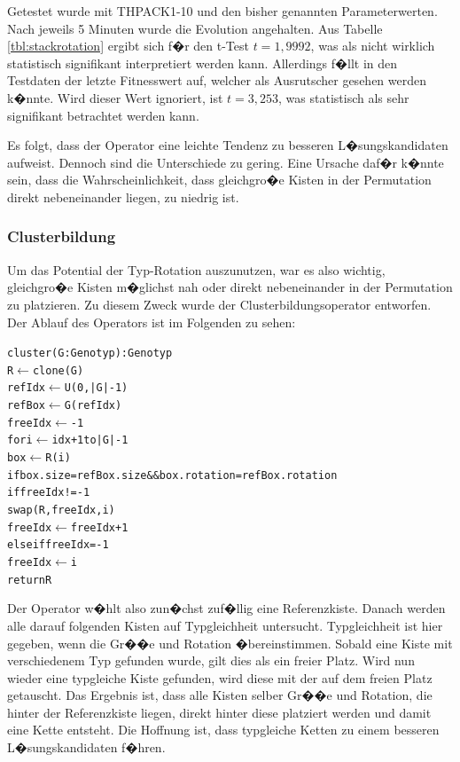 \documentclass[a4paper,abstracton,12pt]{scrartcl}
\begin{document}
Getestet wurde mit THPACK1-10 und den bisher genannten Parameterwerten. Nach jeweils 5 Minuten wurde die Evolution angehalten. Aus Tabelle \ref{tbl:stackrotation} ergibt sich f�r den t-Test $t=1,9992$, was als nicht wirklich statistisch signifikant interpretiert werden kann. Allerdings f�llt in den Testdaten der letzte Fitnesswert auf, welcher als Ausrutscher gesehen werden k�nnte. Wird dieser Wert ignoriert, ist $t=3,253$, was statistisch als sehr signifikant betrachtet werden kann.

Es folgt, dass der Operator eine leichte Tendenz zu besseren L�sungskandidaten aufweist. Dennoch sind die Unterschiede zu gering. Eine Ursache daf�r k�nnte sein, dass die Wahrscheinlichkeit, dass gleichgro�e Kisten in der Permutation direkt nebeneinander liegen, zu niedrig ist.

\subsubsection{Clusterbildung}

Um das Potential der Typ-Rotation auszunutzen, war es also wichtig, gleichgro�e Kisten m�glichst nah oder direkt nebeneinander in der Permutation zu platzieren. Zu diesem Zweck wurde der Clusterbildungsoperator entworfen. Der Ablauf des Operators ist im Folgenden zu sehen:

\begin{alltt}
cluster(G: Genotyp): Genotyp
  R \(\leftarrow\) clone(G)
  refIdx \(\leftarrow\) U(0,|G|-1)
  refBox \(\leftarrow\) G(refIdx)
  freeIdx \(\leftarrow\) -1
  for i \(\leftarrow\) idx + 1 to |G|-1
    box \(\leftarrow\) R(i)
    if box.size = refBox.size && box.rotation = refBox.rotation
      if freeIdx != -1
        swap(R, freeIdx, i)
        freeIdx \(\leftarrow\) freeIdx + 1
    else if freeIdx = -1
      freeIdx \(\leftarrow\) i
  return R
\end{alltt}

Der Operator w�hlt also zun�chst zuf�llig eine Referenzkiste. Danach werden alle darauf folgenden Kisten auf Typgleichheit untersucht. Typgleichheit ist hier gegeben, wenn die Gr��e und Rotation �bereinstimmen. Sobald eine Kiste mit verschiedenem Typ gefunden wurde, gilt dies als ein freier Platz. Wird nun wieder eine typgleiche Kiste gefunden, wird diese mit der auf dem freien Platz getauscht. Das Ergebnis ist, dass alle Kisten selber Gr��e und Rotation, die hinter der Referenzkiste liegen, direkt hinter diese platziert werden und damit eine Kette entsteht. Die Hoffnung ist, dass typgleiche Ketten zu einem besseren L�sungskandidaten f�hren.
\end{document}
